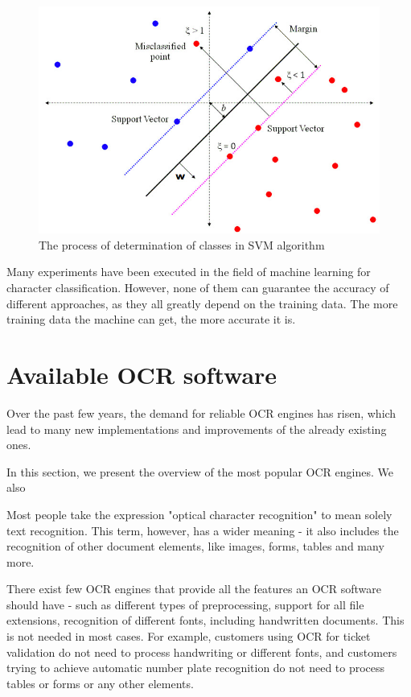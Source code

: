 \begin{figure}[H]
\centering
\includegraphics[width=0.7\linewidth]{img/characterClassification/svm.jpg}
\caption{The process of determination of classes in SVM algorithm \citep{svmAlgorithm}} \label{fig:1a}
\end{figure}

Many experiments have been executed in the field of machine learning for character classification. However, none of them can guarantee the accuracy of different approaches, as they all greatly depend on the training data. The more training data the machine can get, the more accurate it is. 

\section{Available OCR software}

Over the past few years, the demand for reliable OCR engines has risen, which lead to many new implementations and improvements of the already existing ones.

In this section, we present the overview of the most popular OCR engines. We also 

Most people take the expression "optical character recognition" to mean solely text recognition. This term, however, has a wider meaning - it also includes the recognition of other document elements, like images, forms, tables and many more.

There exist few OCR engines that provide all the features an OCR software should have - such as different types of preprocessing, support for all file extensions, recognition of different fonts, including handwritten documents. This is not needed in most cases. For example, customers using OCR for ticket validation do not need to process handwriting or different fonts, and customers trying to achieve automatic number plate recognition do not need to process tables or forms or any other elements.

